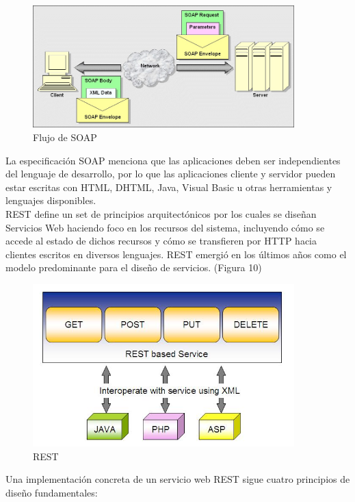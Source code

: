 \documentclass[12pt,letterpaper,titlepage]{article}
\begin{document}
\begin{itemize}
\begin{itemize}
\begin{figure}
  \centering
    \includegraphics[width=0.9\textwidth]{9_soap}
  \caption{Flujo de SOAP}
  \label{fig9:soap}
\end{figure}

La especificación SOAP menciona que las aplicaciones deben ser independientes del lenguaje de desarrollo, por lo que las aplicaciones cliente y servidor pueden estar escritas con HTML, DHTML, Java, Visual Basic u otras herramientas y lenguajes disponibles.\\


REST define un set de principios arquitectónicos por los cuales se diseñan Servicios Web haciendo foco en los recursos del sistema, incluyendo cómo se accede al estado de dichos recursos y cómo se transfieren por HTTP hacia clientes escritos en diversos lenguajes. REST emergió en los últimos años como el modelo predominante para el diseño de servicios. (Figura 10)\\

\begin{figure}
  \centering
    \includegraphics[width=0.9\textwidth]{10_rest}
  \caption{REST}
  \label{fig10:rest}
\end{figure}
Una implementación concreta de un servicio web REST sigue cuatro principios de diseño fundamentales:\\


\end{itemize}
\end{itemize}
\end{document}
